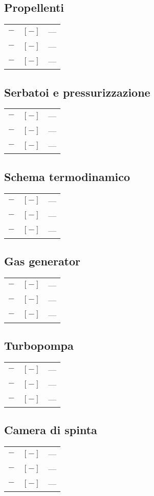 \begin{multicols}{2}
	\subsection{Propellenti}
	\begin{tabular}{ccl}
		$\bm{-}$ & $[-]$ & --- \\
		$\bm{-}$ & $[-]$ & --- \\
		$\bm{-}$ & $[-]$ & ---
	\end{tabular}

	\subsection{Serbatoi e pressurizzazione}
	\begin{tabular}{ccl}
		$\bm{-}$ & $[-]$ & --- \\
		$\bm{-}$ & $[-]$ & --- \\
		$\bm{-}$ & $[-]$ & ---
	\end{tabular}

	\subsection{Schema termodinamico}
	\begin{tabular}{ccl}
		$\bm{-}$ & $[-]$ & --- \\
		$\bm{-}$ & $[-]$ & --- \\
		$\bm{-}$ & $[-]$ & ---
	\end{tabular}

	\subsection{Gas generator}
	\begin{tabular}{ccl}
		$\bm{-}$ & $[-]$ & --- \\
		$\bm{-}$ & $[-]$ & --- \\
		$\bm{-}$ & $[-]$ & ---
	\end{tabular}
	
	\subsection{Turbopompa}
	\begin{tabular}{ccl}
		$\bm{-}$ & $[-]$ & --- \\
		$\bm{-}$ & $[-]$ & --- \\
		$\bm{-}$ & $[-]$ & ---
	\end{tabular}

	\subsection{Camera di spinta}
	\begin{tabular}{ccl}
		$\bm{-}$ & $[-]$ & --- \\
		$\bm{-}$ & $[-]$ & --- \\
		$\bm{-}$ & $[-]$ & ---
	\end{tabular}


\end{multicols}

